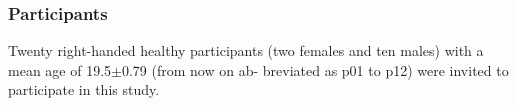 \documentclass{beamer}
\begin{document}
\begin{frame}
\frametitle{Participants}
\vspace{-0.7cm}

Twenty right-handed healthy participants (two females and
ten males) with a mean age of 19.5$\pm$0.79 (from now on ab-
breviated as p01 to p12) were invited to participate in this
study.

%



\end{frame}







%
%
%
%
%
%
%
%
%
%
%

%
%
%
%
%
%
%
%
%
%
%
%
%
%
%
%
%
\end{document}
